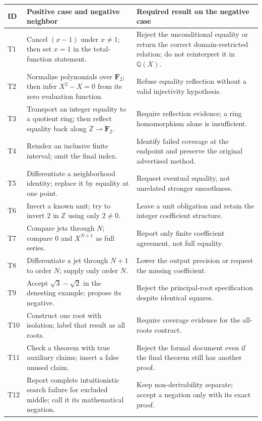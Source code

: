 \documentclass[11pt,letterpaper]{article}
\newcommand{\Z}{\mathbb Z}
\newcommand{\Q}{\mathbb Q}
\numberwithin{equation}{section}
\begin{document}
\begin{longtable}{@{}P{.06\textwidth}P{.44\textwidth}P{.42\textwidth}@{}}
\toprule
ID & Positive case and negative neighbor & Required result on the negative case\\
\midrule
\endhead
T1 & Cancel $(x-1)$ under $x\ne1$; then set $x=1$ in the total-function statement.
& Reject the unconditional equality or return the correct domain-restricted
relation; do not reinterpret it in $\Q(X)$.\\
T2 & Normalize polynomials over $\mathbf F_2$; then infer $X^2-X=0$ from its zero
evaluation function. & Refuse equality reflection without a valid injectivity
hypothesis.\\
T3 & Transport an integer equality to a quotient ring; then reflect equality
back along $\Z\to\mathbf F_2$. & Require reflection evidence; a ring homomorphism
alone is insufficient.\\
T4 & Reindex an inclusive finite interval; omit the final index. & Identify failed
coverage at the endpoint and preserve the original advertised method.\\
T5 & Differentiate a neighborhood identity; replace it by equality at one point.
& Request eventual equality, not unrelated stronger smoothness.\\
T6 & Invert a known unit; try to invert $2$ in $\Z$ using only $2\ne0$. & Leave a
unit obligation and retain the integer coefficient structure.\\
T7 & Compare jets through $N$; compare $0$ and $X^{N+1}$ as full series. & Report
only finite coefficient agreement, not full equality.\\
T8 & Differentiate a jet through $N+1$ to order $N$; supply only order $N$. &
Lower the output precision or request the missing coefficient.\\
T9 & Accept $\sqrt3-\sqrt2$ in the denesting example; propose its negative. &
Reject the principal-root specification despite identical squares.\\
T10 & Construct one root with isolation; label that result as all roots. & Require
coverage evidence for the all-roots contract.\\
T11 & Check a theorem with true auxiliary claims; insert a false unused claim. &
Reject the formal document even if the final theorem still has another proof.\\
T12 & Report complete intuitionistic search failure for excluded middle; call it
its mathematical negation. & Keep non-derivability separate; accept a negation
only with its exact proof.\\

\end{longtable}
\end{document}
